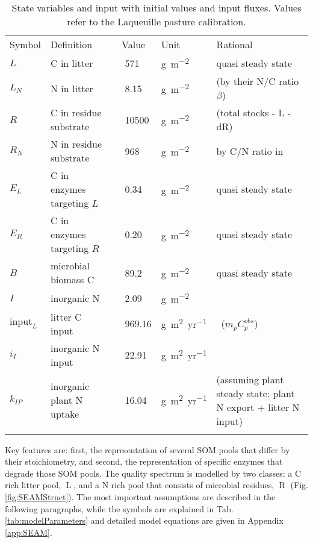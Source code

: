 \begin{table*}[t]
\caption{
\label{tab:modelStates}
State variables and input with initial values and input fluxes. Values refer to the Laqueuille pasture calibration. }
\begin{tabular}{lp{4cm}lllp{5.5cm}}
\tophline
Symbol &  Definition & \multicolumn{2}{c}{Value} & Unit & Rational \\
\middlehline
$L$ &  C in litter & & 571 & \unit{g~m^{-2}} & quasi steady state 
\\
$L_N$ &  N in litter & & 8.15 & \unit{g~m^{-2}} & \citep{Perveen14}
(by their N/C ratio $\beta$)
\\
$R$ &  C in residue substrate & & 10500 & \unit{g~m^{-2}} &
\citep{Allard07} (total stocks - L - dR)
\\
$R_N$ &  N in residue substrate & & 968 & \unit{g~m^{-2}} & by C/N
ratio in \citep{Perveen14} \\
$E_L$ &  C in enzymes targeting $L$ & & 0.34 & \unit{g~m^{-2}} & 
quasi steady state \\
$E_R$ &  C in enzymes targeting $R$ & & 0.20 & \unit{g~m^{-2}} & 
quasi steady state \\
$B$ & microbial biomass C & & 89.2 & \unit{g~m^{-2}} &  quasi steady
state \\
$I$ & inorganic N & & 2.09 & \unit{g~m^{-2}} & \citep{Perveen14} \\
\middlehline
$\mathrm{input}_{L}$ & litter C input & & 969.16 &
\unit{g~m^2yr^{-1}} & \citep{Perveen14} \, ($m_p C^{obs}_p$)\\
$i_{I}$ & inorganic N input & & 22.91 & \unit{g~m^2yr^{-1}} 
& \citep{Perveen14} \\
$k_{IP}$ & inorganic plant N uptake & & 16.04 & 
\unit{g~m^2yr^{-1}} & \citep{Perveen14} (assuming plant
steady state: plant N export + litter N input)\\
\bottomhline
\end{tabular}
\end{table*}

Key features are: first, the representation of several SOM pools that differ by
their stoichiometry, and second, the representation of specific enzymes that
degrade those SOM pools. The quality spectrum is modelled by two classes: a C
rich litter pool, $\operatorname{L}$, and a N rich pool that consists of
microbial residues, $\operatorname{R}$ (Fig. \ref{fig:SEAMStruct}). The most
important assumptions are described in the following paragraphs, while the
symbols are explained in Tab. \ref{tab:modelParameters} and detailed model
equations are given in Appendix \ref{app:SEAM}.

